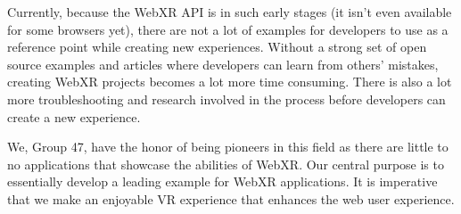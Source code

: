 



Currently, because the WebXR API is in such early stages (it isn’t even available for some browsers yet), there are not a lot of examples for developers to use as a reference point while creating new experiences. Without a strong set of open source examples and articles where developers can learn from others’ mistakes, creating WebXR projects becomes a lot more time consuming. There is also a lot more troubleshooting and research involved in the process before developers can create a new experience.

We, Group 47, have the honor of being pioneers in this field as there are little to no applications that showcase the abilities of WebXR. Our central purpose is to essentially develop a leading example for WebXR applications. It is imperative that we make an enjoyable VR experience that enhances the web user experience.